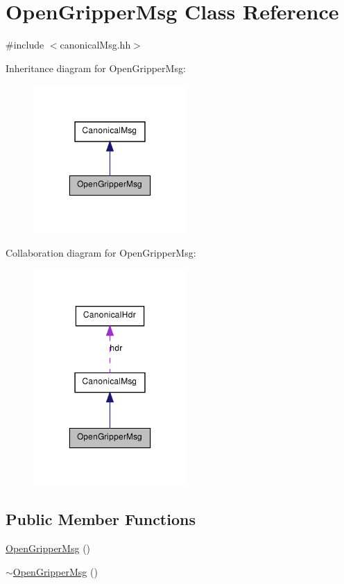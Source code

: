 \hypertarget{class_open_gripper_msg}{
\section{OpenGripperMsg Class Reference}
\label{class_open_gripper_msg}
}


{\ttfamily \#include $<$canonicalMsg.hh$>$}



Inheritance diagram for OpenGripperMsg:\nopagebreak
\begin{figure}[H]
\begin{center}
\leavevmode
\includegraphics[width=166pt]{class_open_gripper_msg__inherit__graph}
\end{center}
\end{figure}


Collaboration diagram for OpenGripperMsg:\nopagebreak
\begin{figure}[H]
\begin{center}
\leavevmode
\includegraphics[width=166pt]{class_open_gripper_msg__coll__graph}
\end{center}
\end{figure}
\subsection*{Public Member Functions}
\begin{DoxyCompactItemize}
\item 
\hyperlink{class_open_gripper_msg_a5297728de08fa46306d0080e6b2da54b}{OpenGripperMsg} ()
\item 
\hyperlink{class_open_gripper_msg_ae0affb606d5c17981f95198e0af4e2e5}{$\sim$OpenGripperMsg} ()
\end{DoxyCompactItemize}


